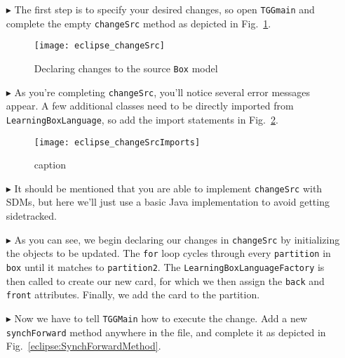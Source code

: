 \begin{itemize}

\item[$\blacktriangleright$] The first step is to specify your desired changes, so open \texttt{TGGmain} and complete the empty \texttt{changeSrc} method as
depicted in Fig.~\ref{eclipse:changeSrc}. 

\vspace{0.5cm}

\begin{figure}[htbp]
\begin{center}
  \texttt{[image: eclipse\_changeSrc]}
  \caption{Declaring changes to the source \texttt{Box} model}
  \label{eclipse:changeSrc}
\end{center}
\end{figure}

\vspace{0.5cm}

\item[$\blacktriangleright$] As you're completing \texttt{changeSrc}, you'll notice several error messages appear. A few additional classes need to be directly
imported from \texttt{LearningBoxLanguage}, so add the import statements in Fig.~\ref{eclipse:changeSrcImports}.

\newpage

\begin{figure}[htbp]
\begin{center}
  \texttt{[image: eclipse\_changeSrcImports]}
  \caption{caption}
  \label{eclipse:changeSrcImports}
\end{center}
\end{figure}

\item[$\blacktriangleright$] It should be mentioned that you are able to implement \texttt{changeSrc} with SDMs, but here we'll just use a basic Java
implementation to avoid getting sidetracked.

\item[$\blacktriangleright$] As you can see, we begin declaring our changes in \texttt{changeSrc} by initializing the objects to be updated. The \texttt{for}
loop cycles through every \texttt{partition} in \texttt{box} until it matches to \texttt{partition2}. The \texttt{Learn\-ing\-Box\-Lang\-uage\-Fact\-ory} is then
called to create our new card, for which we then assign the \texttt{back} and \texttt{front} attributes. Finally, we add the card to the partition.
 
\item[$\blacktriangleright$] Now we have to tell \texttt{TGGMain} how to execute the change. Add a new \texttt{synchForward} method anywhere in the file, and
complete it as depicted in Fig.~\ref{eclipse:SynchForwardMethod}.


\end{itemize}
